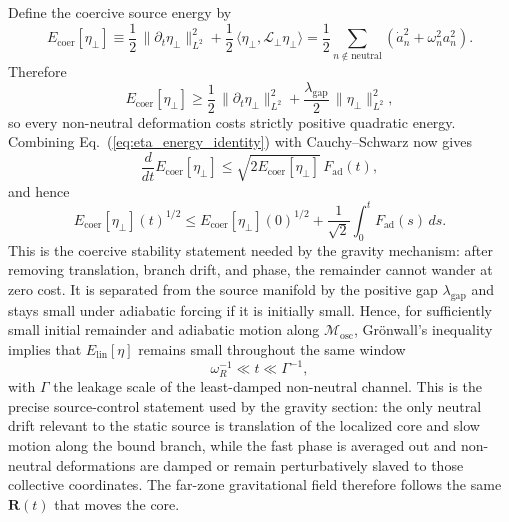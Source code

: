 \documentclass[aps,prd,onecolumn,superscriptaddress,nofootinbib,showpacs,12pt,notitlepage]{revtex4-2}
\begin{document}
Define the coercive source energy by
\begin{equation}\label{eq:coercive_source_energy}
  E_{\mathrm{coer}}[\eta_\perp]
  \equiv \frac{1}{2}\,\|\partial_t\eta_\perp\|_{L^2}^2
  + \frac{1}{2}\,\langle \eta_\perp,\mathcal{L}_{\perp}\eta_\perp\rangle
  = \frac{1}{2}\sum_{n\notin \mathrm{neutral}}
    \left(\dot a_n^2 + \omega_n^2 a_n^2\right).
\end{equation}
Therefore
\begin{equation}\label{eq:coercive_lower_bound}
  E_{\mathrm{coer}}[\eta_\perp]
  \ge \frac{1}{2}\,\|\partial_t\eta_\perp\|_{L^2}^2
    + \frac{\lambda_{\mathrm{gap}}}{2}\,\|\eta_\perp\|_{L^2}^2,
\end{equation}
so every non-neutral deformation costs strictly positive quadratic
energy.  Combining Eq.~(\ref{eq:eta_energy_identity}) with
Cauchy--Schwarz now gives
\begin{equation}\label{eq:coercive_growth_bound}
  \frac{d}{dt}E_{\mathrm{coer}}[\eta_\perp]
  \le \sqrt{2E_{\mathrm{coer}}[\eta_\perp]}\,F_{\mathrm{ad}}(t),
\end{equation}
and hence
\begin{equation}\label{eq:coercive_integrated_bound}
  E_{\mathrm{coer}}[\eta_\perp](t)^{1/2}
  \le E_{\mathrm{coer}}[\eta_\perp](0)^{1/2}
  + \frac{1}{\sqrt{2}}\int_0^t F_{\mathrm{ad}}(s)\,ds.
\end{equation}
This is the coercive stability statement needed by the gravity
mechanism: after removing translation, branch drift, and phase,
the remainder cannot wander at zero cost.  It is separated from the
source manifold by the positive gap $\lambda_{\mathrm{gap}}$ and stays
small under adiabatic forcing if it is initially small.
Hence, for sufficiently small initial remainder and adiabatic motion
along $\mathcal{M}_{\mathrm{osc}}$, Gr\"onwall's inequality implies
that $E_{\mathrm{lin}}[\eta]$ remains small throughout the same
window
\begin{equation}\label{eq:source_control_window}
  \omega_R^{-1} \ll t \ll \Gamma^{-1},
\end{equation}
with $\Gamma$ the leakage scale of the least-damped non-neutral
channel.  This is the precise source-control statement used by the
gravity section: the only neutral drift relevant to the static source
is translation of the localized core and slow motion along the bound
branch, while the fast phase is averaged out and non-neutral
deformations are damped or remain perturbatively slaved to those
collective coordinates.  The far-zone gravitational field therefore
follows the same $\mathbf{R}(t)$ that moves the core.
\end{document}
